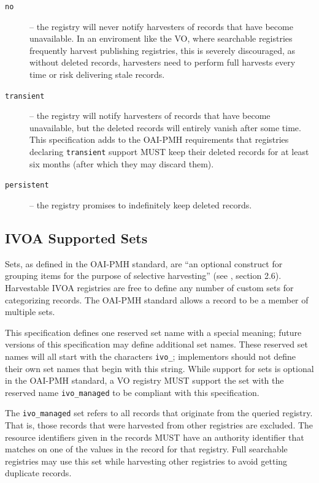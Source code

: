 \documentclass{ivoa}
\begin{document}
\begin{description}

\item[\texttt{no}] -- the registry will never notify harvesters of
records that have become unavailable.  In an enviroment like the VO, 
where searchable registries frequently harvest publishing registries,
this is severely discouraged, as without deleted records, harvesters
need to perform full harvests every time or risk delivering stale
records.
\item[\texttt{transient}] -- the registry will notify harvesters of
records that have become unavailable, but the deleted records will
entirely vanish after some time.  This specification adds to the OAI-PMH
requirements that registries declaring \texttt{transient} support MUST
keep their deleted records for at least six months (after which they may
discard them).
\item[\texttt{persistent}] -- the registry promises to indefinitely keep
deleted records.
\end{description}

\subsection{IVOA Supported Sets}

\label{supportedsets}

Sets, as defined in the OAI-PMH standard, are ``an optional construct
for grouping items for the purpose of selective harvesting'' (see 
\citet{std:OAIPMH}, section 2.6). Harvestable IVOA registries are free
to define any number of custom sets for categorizing records. The
OAI-PMH standard allows a record to be a member of multiple sets.

This specification defines one reserved set name with a special
meaning; future versions of this specification may define additional set
names.  These reserved set names will all start with the characters
\texttt{ivo\_}; implementors should not define their own set names
that begin with this string. While support for sets is optional 
in the OAI-PMH standard, a VO registry MUST support
the set with the reserved name \texttt{ivo\_managed} to be compliant
with this specification.

The \texttt{ivo\_managed} set refers to all records that originate from the
queried registry. That is, those records that were harvested from other
registries are excluded. The resource identifiers given in the
records MUST have an authority identifier that matches on one of the
 values in the 
record for that registry.  Full searchable registries may use this set
while harvesting other registries to avoid getting duplicate records.
\end{document}
